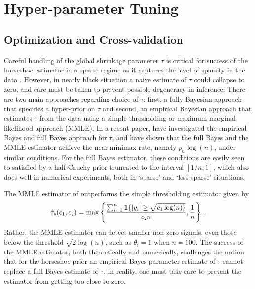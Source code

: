 \documentclass[11pt]{article}
\begin{document}

\section{Hyper-parameter Tuning}

\subsection{Optimization and Cross-validation}

Careful handling of the global shrinkage parameter $\tau$ is critical for
success of the horseshoe estimator in a sparse regime as it captures the level
of sparsity in the data \citep{carvalho2010horseshoe, datta2013asymptotic, van2015conditions}. However, in nearly black situation a naive
estimate of $\tau$ could collapse to zero, and care must be taken to prevent
possible degeneracy in inference. There are two main approaches regarding
choice of $\tau$: first, a fully Bayesian approach that specifies a hyper-prior
on $\tau$ and second, an empirical Bayesian approach that estimates $\tau$ from
the data using a simple thresholding or maximum marginal likelihood approach
(MMLE). In a recent paper, \citet{van2017adaptive} have investigated the
empirical Bayes and full Bayes approach for $\tau$, and have shown that the
full Bayes and the MMLE estimator achieve the near minimax rate, namely $p_n
\log(n)$, under similar conditions. For the full Bayes estimator, these
conditions are easily seen to satisfied by a half-Cauchy prior truncated to the
interval $[1/n,1]$, which also does well in numerical experiments, both in
`sparse' and `less-sparse' situations. 

The MMLE estimator of \citet{van2017adaptive} outperforms the simple
thresholding estimator given by
\[
  \hat{\tau}_s(c_1, c_2) = \max \left \{ \frac{\sum_{i=1}^{n} {\bf 1} \{ \lvert y_i\rvert \ge
  \sqrt{c_1 \log(n) \}}}{c_2 n}, \frac{1}{n} \right\}
  \;.
\]
Rather, the MMLE estimator can detect smaller non-zero signals, even those below the threshold $\sqrt{2 \log(n)}$, such as $\theta_i = 1$ when $n = 100$. 
The success of the MMLE estimator, both theoretically and numerically,
challenges the notion that for the horseshoe prior an empirical Bayes parameter
estimate of $\tau$ cannot replace a full Bayes estimate of $\tau$. In reality,
one must take care to prevent the estimator from getting too close to zero. 
\end{document}
